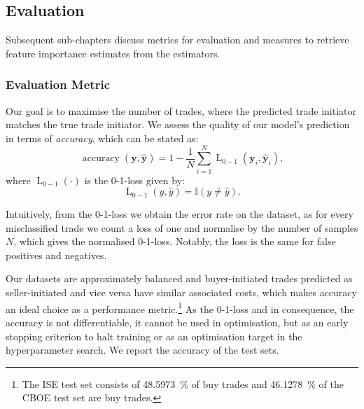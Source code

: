 \subsection{Evaluation}\label{sec:evaluation}

Subsequent sub-chapters discuss metrics for evaluation and measures to retrieve feature importance estimates from the estimators.

\subsubsection{Evaluation Metric}\label{sec:evaluation-metric}

Our goal is to maximise the number of trades, where the predicted trade initiator matches the true trade initiator. We assess the quality of our model’s prediction in terms of \emph{accuracy}, which can be stated as:
\begin{equation}
    \operatorname{accuracy}(\mathbf{y}, \widehat{\mathbf{y}}) = 1 - \frac{1}{N}\sum_{i=1}^{N} \operatorname{L}_{\mathrm{0-1}}(\mathbf{y}_i, \widehat{\mathbf{y}}_i),
\end{equation}
where $\operatorname{L}_{\mathrm{0-1}}(\cdot)$ is the 0-1-loss given by:
\begin{equation}
    \operatorname{L}_{\mathrm{0-1}}(y, \hat{y}) = \mathbb{I}\left(y\neq \hat{y}\right).
\end{equation}

Intuitively, from the 0-1-loss we obtain the error rate on the dataset, as for every misclassified trade we count a loss of one and normalise by the number of samples $N$, which gives the normalised 0-1-loss. Notably, the loss is the same for false positives and negatives.

Our datasets are approximately balanced and buyer-initiated trades predicted as seller-initiated and vice versa have similar associated costs, which makes accuracy an ideal choice as a performance metric.\footnote{The \gls{ISE} test set consists of \SI{48.5973}{\percent} of buy trades and \SI{46.1278}{\percent} of the \gls{CBOE} test set are buy trades.} As the 0-1-loss and in consequence, the accuracy is not differentiable, it cannot be used in optimisation, but as an early stopping criterion to halt training or as an optimisation target in the hyperparameter search. We report the accuracy of the test sets.

